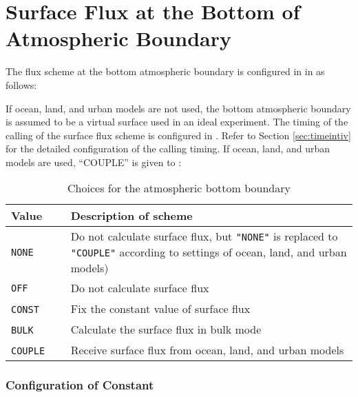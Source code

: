 \section{Surface Flux at the Bottom of Atmospheric Boundary } \label{sec:basic_usel_surface}
The flux scheme at the bottom atmospheric boundary is configured in  in  as follows:

If ocean, land, and urban models are not used, the bottom atmospheric boundary is assumed to be a virtual surface used in an ideal experiment. The timing of the calling of the surface flux scheme is configured in . Refer to Section \ref{sec:timeintiv} for the detailed configuration of the calling timing. If ocean, land, and urban models are used, ``COUPLE'' is given to :

\begin{table}[htb]
\begin{center}
  \caption{Choices for the atmospheric bottom boundary }
  \label{tab:nml_atm_sf}
  \begin{tabularx}{150mm}{lX} \hline
    \rowcolor[gray]{0.9}  Value & Description of scheme\\ \hline
      \verb|NONE|         & Do not calculate surface flux, but \verb|"NONE"| is replaced to \verb|"COUPLE"| according to settings of ocean, land, and urban models) \\
      \verb|OFF|          & Do not calculate surface flux\\
      \verb|CONST|   　　　& Fix the constant value of surface flux \\
      \verb|BULK|    　　　& Calculate the surface flux in bulk mode \\
      \verb|COUPLE|  　　　& Receive surface flux from ocean, land, and urban models \\
    \hline
  \end{tabularx}
\end{center}
\end{table}

\subsubsection{Configuration of Constant}

